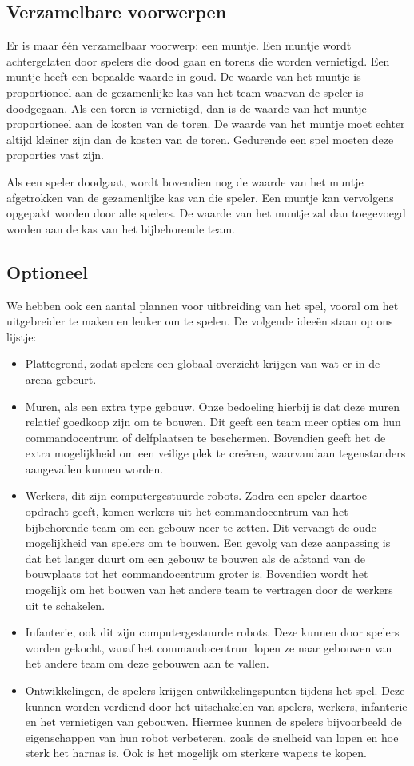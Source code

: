 \subsection{Verzamelbare voorwerpen}
Er is maar \'e\'en verzamelbaar voorwerp: een muntje. Een muntje wordt achtergelaten door spelers die dood gaan en torens die worden vernietigd. Een muntje heeft een bepaalde waarde in goud. De waarde van het muntje is proportioneel aan de gezamenlijke kas van het team waarvan de speler is doodgegaan. Als een toren is vernietigd, dan is de waarde van het muntje proportioneel aan de kosten van de toren. De waarde van het muntje moet echter altijd kleiner zijn dan de kosten van de toren. Gedurende een spel moeten deze proporties vast zijn.

Als een speler doodgaat, wordt bovendien nog de waarde van het muntje afgetrokken van de gezamenlijke kas van die speler. Een muntje kan vervolgens opgepakt worden door alle spelers. De waarde van het muntje zal dan toegevoegd worden aan de kas van het bijbehorende team.

\subsection{Optioneel}
We hebben ook een aantal plannen voor uitbreiding van het spel, vooral om het uitgebreider te maken en leuker om te spelen. De volgende idee\"en staan op ons lijstje:
\begin{itemize}
  \item Plattegrond, zodat spelers een globaal overzicht krijgen van wat er in de arena gebeurt.
  \item Muren, als een extra type gebouw. Onze bedoeling hierbij is dat deze muren relatief goedkoop zijn om te bouwen. Dit geeft een team meer opties om hun commandocentrum of delfplaatsen te beschermen. Bovendien geeft het de extra mogelijkheid om een veilige plek te cre\"eren, waarvandaan tegenstanders aangevallen kunnen worden.
  \item Werkers, dit zijn computergestuurde robots. Zodra een speler daartoe opdracht geeft, komen werkers uit het commandocentrum van het bijbehorende team om een gebouw neer te zetten. Dit vervangt de oude mogelijkheid van spelers om te bouwen. Een gevolg van deze aanpassing is dat het langer duurt om een gebouw te bouwen als de afstand van de bouwplaats tot het commandocentrum groter is. Bovendien wordt het mogelijk om het bouwen van het andere team te vertragen door de werkers uit te schakelen.
  \item Infanterie, ook dit zijn computergestuurde robots. Deze kunnen door spelers worden gekocht, vanaf het commandocentrum lopen ze naar gebouwen van het andere team om deze gebouwen aan te vallen.
  \item Ontwikkelingen, de spelers krijgen ontwikkelingspunten tijdens het spel. Deze kunnen worden verdiend door het uitschakelen van spelers, werkers, infanterie en het vernietigen van gebouwen. Hiermee kunnen de spelers bijvoorbeeld de eigenschappen van hun robot verbeteren, zoals de snelheid van lopen en hoe sterk het harnas is. Ook is het mogelijk om sterkere wapens te kopen.
\end{itemize} 